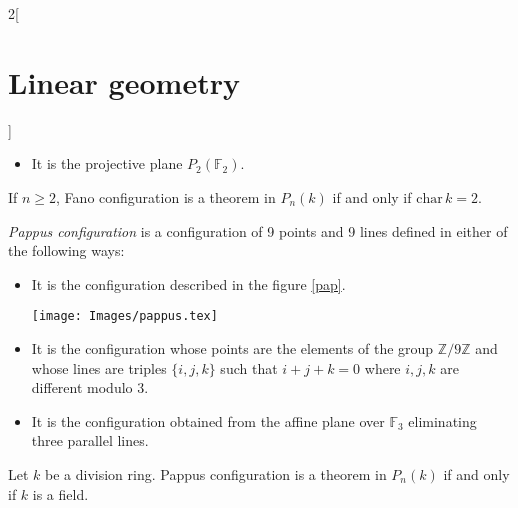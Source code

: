 \documentclass[class=article,10pt,crop=false]{standalone}
\begin{document}
\begin{multicols}{2}[\section{Linear geometry}]
\begin{definition}
\begin{itemize}
    \item It is the projective plane $P_2(\mathbb{F}_2)$.
\end{itemize}
\end{definition}
\begin{theorem}
If $n\geq 2$, Fano configuration is a theorem in $P_n(k)$ if and only if $\text{char}\,k=2$.
\end{theorem}
\begin{definition}
\textit{Pappus configuration} is a configuration of 9 points and 9 lines defined in either of the following ways:
\begin{itemize}
    \item It is the configuration described in the figure \ref{pap}.\par
    \begin{minipage}{\linewidth}
        \centering
        \texttt{[image: Images/pappus.tex]} 
        \label{pap}
    \end{minipage} 
    \item It is the configuration whose points are the elements of the group $\mathbb{Z}/9\mathbb{Z}$ and whose lines are triples $\{i,j,k\}$ such that $i+j+k=0$ where $i,j,k$ are different modulo 3.
    \item It is the configuration obtained from the affine plane over $\mathbb{F}_3$ eliminating three parallel lines.
\end{itemize}
\end{definition}
\begin{theorem}
Let $k$ be a division ring. Pappus configuration is a theorem in $P_n(k)$ if and only if $k$ is a field.
\end{theorem}

\end{multicols}
\end{document}
